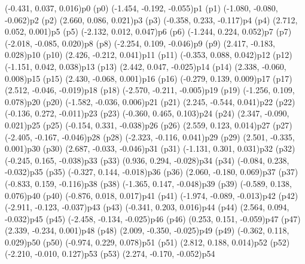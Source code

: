 \psPoint(-0.431, 0.037, 0.016){p0}
\psdot(p0)
\psPoint(-1.454, -0.192, -0.055){p1}
\psdot(p1)
\psPoint(-1.080, -0.080, -0.062){p2}
\psdot(p2)
\psPoint(2.660, 0.086, 0.021){p3}
\psdot(p3)
\psPoint(-0.358, 0.233, -0.117){p4}
\psdot(p4)
\psPoint(2.712, 0.052, 0.001){p5}
\psdot(p5)
\psPoint(-2.132, 0.012, 0.047){p6}
\psdot(p6)
\psPoint(-1.244, 0.224, 0.052){p7}
\psdot(p7)
\psPoint(-2.018, -0.085, 0.020){p8}
\psdot(p8)
\psPoint(-2.254, 0.109, -0.046){p9}
\psdot(p9)
\psPoint(2.417, -0.183, 0.028){p10}
\psdot(p10)
\psPoint(2.426, -0.212, 0.041){p11}
\psdot(p11)
\psPoint(-0.353, 0.088, 0.042){p12}
\psdot(p12)
\psPoint(-1.151, 0.042, 0.038){p13}
\psdot(p13)
\psPoint(2.442, 0.047, -0.025){p14}
\psdot(p14)
\psPoint(2.338, -0.060, 0.008){p15}
\psdot(p15)
\psPoint(2.430, -0.068, 0.001){p16}
\psdot(p16)
\psPoint(-0.279, 0.139, 0.009){p17}
\psdot(p17)
\psPoint(2.512, -0.046, -0.019){p18}
\psdot(p18)
\psPoint(-2.570, -0.211, -0.005){p19}
\psdot(p19)
\psPoint(-1.256, 0.109, 0.078){p20}
\psdot(p20)
\psPoint(-1.582, -0.036, 0.006){p21}
\psdot(p21)
\psPoint(2.245, -0.544, 0.041){p22}
\psdot(p22)
\psPoint(-0.136, 0.272, -0.011){p23}
\psdot(p23)
\psPoint(-0.360, 0.465, 0.103){p24}
\psdot(p24)
\psPoint(2.347, -0.090, 0.021){p25}
\psdot(p25)
\psPoint(-0.154, 0.331, -0.038){p26}
\psdot(p26)
\psPoint(2.559, 0.123, 0.014){p27}
\psdot(p27)
\psPoint(-2.405, -0.167, -0.046){p28}
\psdot(p28)
\psPoint(-2.323, -0.116, 0.041){p29}
\psdot(p29)
\psPoint(2.501, -0.335, 0.001){p30}
\psdot(p30)
\psPoint(2.687, -0.033, -0.046){p31}
\psdot(p31)
\psPoint(-1.131, 0.301, 0.031){p32}
\psdot(p32)
\psPoint(-0.245, 0.165, -0.038){p33}
\psdot(p33)
\psPoint(0.936, 0.294, -0.028){p34}
\psdot(p34)
\psPoint(-0.084, 0.238, -0.032){p35}
\psdot(p35)
\psPoint(-0.327, 0.144, -0.018){p36}
\psdot(p36)
\psPoint(2.060, -0.180, 0.069){p37}
\psdot(p37)
\psPoint(-0.833, 0.159, -0.116){p38}
\psdot(p38)
\psPoint(-1.365, 0.147, -0.048){p39}
\psdot(p39)
\psPoint(-0.589, 0.138, 0.076){p40}
\psdot(p40)
\psPoint(-0.876, 0.018, 0.017){p41}
\psdot(p41)
\psPoint(-1.974, -0.089, -0.013){p42}
\psdot(p42)
\psPoint(-2.911, -0.123, -0.037){p43}
\psdot(p43)
\psPoint(-0.341, 0.203, 0.016){p44}
\psdot(p44)
\psPoint(2.564, 0.094, -0.032){p45}
\psdot(p45)
\psPoint(-2.458, -0.134, -0.025){p46}
\psdot(p46)
\psPoint(0.253, 0.151, -0.059){p47}
\psdot(p47)
\psPoint(2.339, -0.234, 0.001){p48}
\psdot(p48)
\psPoint(2.009, -0.350, -0.025){p49}
\psdot(p49)
\psPoint(-0.362, 0.118, 0.029){p50}
\psdot(p50)
\psPoint(-0.974, 0.229, 0.078){p51}
\psdot(p51)
\psPoint(2.812, 0.188, 0.014){p52}
\psdot(p52)
\psPoint(-2.210, -0.010, 0.127){p53}
\psdot(p53)
\psPoint(2.274, -0.170, -0.052){p54}
